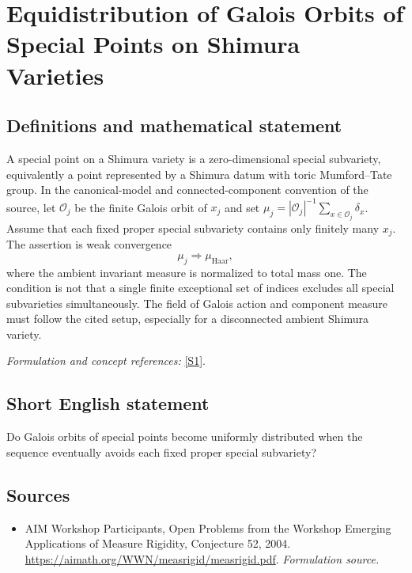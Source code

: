 \documentclass[11pt]{article}
\begin{document}
\section*{\texorpdfstring{Equidistribution of Galois Orbits of Special Points on Shimura Varieties}{Equidistribution of Galois Orbits of Special Points on Shimura Varieties}}\label{238}
\subsection{Definitions and mathematical statement}
A special point on a Shimura variety is a zero-dimensional special subvariety, equivalently a point represented by a Shimura datum with toric Mumford--Tate group. In the canonical-model and connected-component convention of the source, let $\mathcal O_j$ be the finite Galois orbit of $x_j$ and set
$\mu_j=|\mathcal O_j|^{-1}\sum_{x\in\mathcal O_j}\delta_x$. Assume that each fixed proper special subvariety contains only finitely many $x_j$. The assertion is weak convergence
\[
 \mu_j\Longrightarrow\mu_{\mathrm{Haar}},
\]
where the ambient invariant measure is normalized to total mass one. The condition is not that a single finite exceptional set of indices excludes all special subvarieties simultaneously. The field of Galois action and component measure must follow the cited setup, especially for a disconnected ambient Shimura variety.
\par\smallskip\textit{Formulation and concept references:} \href{https://aimath.org/WWN/measrigid/measrigid.pdf}{[S1]}.

\subsection{Short English statement}
Do Galois orbits of special points become uniformly distributed when the sequence eventually avoids each fixed proper special subvariety?
\subsection{Sources}
\begin{itemize}
\item[S1]AIM Workshop Participants, Open Problems from the Workshop Emerging Applications of Measure Rigidity, Conjecture 52, 2004.
\url{https://aimath.org/WWN/measrigid/measrigid.pdf}.
\textit{Formulation source.}
\end{itemize}
\end{document}
